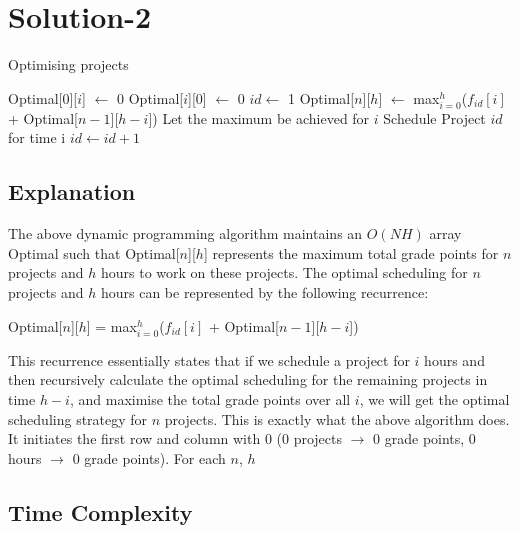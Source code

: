 \documentclass[a4paper,10pt]{article}
\begin{document}
\section{Solution-2}
\begin{algorithm}
 \caption{Optimising projects}
 \begin{algorithmic}
     \State Optimal[$0$][$i$] $\gets$ 0
    \EndFor
     \State Optimal[$i$][$0$] $\gets$ 0
    \EndFor
    \State $id \gets$ 1
      \State Optimal[$n$][$h$] $\gets$ max$_{i=0}^{h}$($f_{id}[i]$ + Optimal[$n-1$][$h-i$])
      \State Let the maximum be achieved for $i$
      \State Schedule Project $id$ for time i
      \State $id \gets id + 1$
     \EndFor
    \EndFor
  \EndFunction
 \end{algorithmic}
\end{algorithm}
\subsection{Explanation}
The above dynamic programming algorithm maintains an $O(NH)$ array Optimal such that Optimal[$n$][$h$]
represents the maximum total grade points for $n$ projects and $h$ hours to work on these projects. The
 optimal scheduling for $n$ projects and $h$ hours can be represented by the following recurrence:
\begin{center}
 Optimal[$n$][$h$] = max$_{i=0}^{h}$($f_{id}[i]$ + Optimal[$n-1$][$h-i$])
\end{center}
This recurrence essentially states that if we schedule a project for $i$ hours and 
then recursively calculate the optimal scheduling for the remaining projects in time $h-i$, and
maximise the total grade points over all $i$, we will get the optimal scheduling strategy for $n$ projects.
This is exactly what the above algorithm does. It initiates the first row and column with 0 
(0 projects $\rightarrow$ 0 grade points, 0 hours $\rightarrow$ 0 grade points). For each $n$, $h$
\subsection{Time Complexity}
\end{document}

